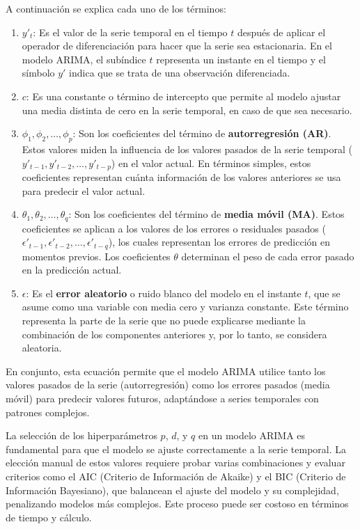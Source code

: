 A continuación se explica cada uno de los términos:

\begin{enumerate}
    \item \textbf{\( y'_t \)}: Es el valor de la serie temporal en el tiempo \( t \) después de aplicar el operador de diferenciación para hacer que la serie sea estacionaria. En el modelo ARIMA, el subíndice \( t \) representa un instante en el tiempo y el símbolo \( y' \) indica que se trata de una observación diferenciada.

    \item \textbf{\( c \)}: Es una constante o término de intercepto que permite al modelo ajustar una media distinta de cero en la serie temporal, en caso de que sea necesario.

    \item \textbf{\( \phi_1, \phi_2, \dots, \phi_p \)}: Son los coeficientes del término de \textbf{autorregresión (AR)}. Estos valores miden la influencia de los valores pasados de la serie temporal (\( y'_{t-1}, y'_{t-2}, \dots, y'_{t-p} \)) en el valor actual. En términos simples, estos coeficientes representan cuánta información de los valores anteriores se usa para predecir el valor actual.

    \item \textbf{\( \theta_1, \theta_2, \dots, \theta_q \)}: Son los coeficientes del término de \textbf{media móvil (MA)}. Estos coeficientes se aplican a los valores de los errores o residuales pasados (\( \epsilon'_{t-1}, \epsilon'_{t-2}, \dots, \epsilon'_{t-q} \)), los cuales representan los errores de predicción en momentos previos. Los coeficientes \( \theta \) determinan el peso de cada error pasado en la predicción actual.

    \item \textbf{\( \epsilon \)}: Es el \textbf{error aleatorio} o ruido blanco del modelo en el instante \( t \), que se asume como una variable con media cero y varianza constante. Este término representa la parte de la serie que no puede explicarse mediante la combinación de los componentes anteriores y, por lo tanto, se considera aleatoria.
\end{enumerate}

En conjunto, esta ecuación permite que el modelo ARIMA utilice tanto los valores pasados de la serie (autorregresión) como los errores pasados (media móvil) para predecir valores futuros, adaptándose a series temporales con patrones complejos.

La selección de los hiperparámetros \( p \), \( d \), y \( q \) en un modelo ARIMA es fundamental para que el modelo se ajuste correctamente a la serie temporal. La elección manual de estos valores requiere probar varias combinaciones y evaluar criterios como el AIC (Criterio de Información de Akaike) y el BIC (Criterio de Información Bayesiano), que balancean el ajuste del modelo y su complejidad, penalizando modelos más complejos. Este proceso puede ser costoso en términos de tiempo y cálculo.

